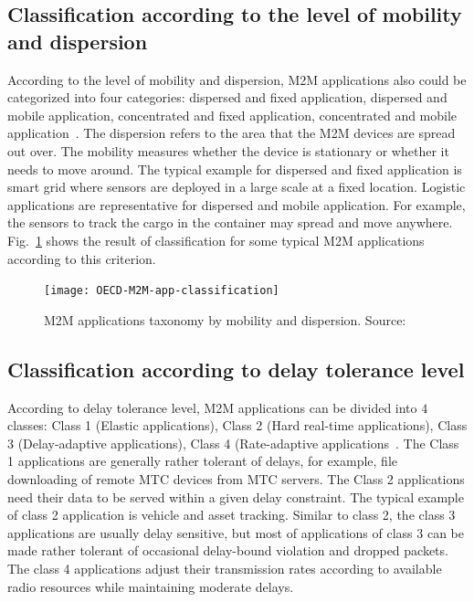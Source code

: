 \subsection{Classification according to the level of mobility and dispersion}
According to the level of mobility and dispersion, M2M applications also could be categorized into four categories: dispersed and fixed application, dispersed and mobile application, concentrated and fixed application, concentrated and mobile application~\cite{OECD/Report}. 
The dispersion refers to the area that the M2M devices are spread out over. 
The mobility measures whether the device is stationary or whether it needs to move around. 
The typical example for dispersed and fixed application is smart grid where sensors are deployed in a large scale at a fixed location. 
Logistic applications are representative for dispersed and mobile application. 
For example, the sensors to track the cargo in the container may spread and move anywhere.
Fig.~\ref{fig:OECD-M2M-app-classification} shows the result of classification for some typical M2M applications according to this criterion.
\begin{figure}[!th]
	\centering
	\texttt{[image: OECD-M2M-app-classification]}
	\caption{M2M applications taxonomy by mobility and dispersion. Source: \cite{OECD/Report}}
	\label{fig:OECD-M2M-app-classification}
\end{figure}
\subsection{Classification according to delay tolerance level}
According to delay tolerance level, M2M applications can be divided into $4$ classes: Class 1 (Elastic applications), Class 2 (Hard real-time applications), Class 3 (Delay-adaptive applications), Class 4 (Rate-adaptive applications~\cite{KanZheng12}. The Class 1 applications are generally rather tolerant of delays, for example, file downloading of remote MTC devices from MTC servers. The Class 2 applications need their data to be served within a given delay constraint. The typical example of class 2 application is vehicle and asset tracking. 
Similar to class 2, the class 3 applications are usually delay sensitive, but most of applications of class 3 can be made rather tolerant of occasional delay-bound violation and dropped packets. 
The class 4 applications adjust their transmission rates according to available radio resources while maintaining moderate delays. 
